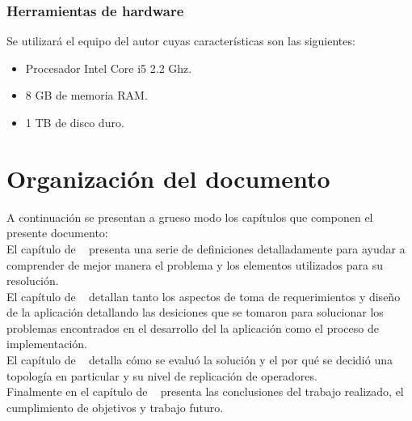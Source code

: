 \subsubsection{Herramientas de hardware}
\label{subsubsec:HerrHardw}

Se utilizará el equipo del autor cuyas características son las siguientes:\\
\begin{itemize}
\item Procesador Intel Core i5 2.2 Ghz.
\item 8 GB de memoria RAM.
\item 1 TB de disco duro.
\end{itemize}

\section{Organización del documento}
\label{intro:organizacion}

A continuación se presentan a grueso modo los capítulos que componen el presente documento:\\

El capítulo de ~ presenta una serie de definiciones detalladamente para ayudar a comprender de mejor manera el problema y los elementos utilizados para su resolución.\\

El capítulo de ~ detallan tanto los aspectos de toma de requerimientos y diseño de la aplicación detallando las desiciones que se tomaron para solucionar los problemas encontrados en el desarrollo del la aplicación como el proceso de implementación.\\

El capítulo de ~ detalla cómo se evaluó la solución y el por qué se decidió una topología en particular y su nivel de replicación de operadores.\\

Finalmente en el capítulo de ~ presenta las conclusiones del trabajo realizado, el cumplimiento de objetivos y trabajo futuro.\\
